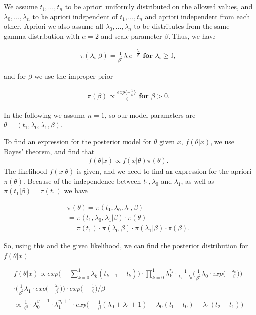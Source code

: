 We assume $t_1,...,t_n$ to be apriori uniformly distributed on the allowed values, and $\lambda_0,...,\lambda_n$ to be apriori independent of $t_1,...,t_n$ and apriori independent from each other. Apriori we also assume all $\lambda_0,...,\lambda_n$ to be distributes from the same gamma distribution with $\alpha = 2$ and scale parameter $\beta$. Thus, we have 

\begin{align}
    \pi(\lambda_i | \beta) = \frac{1}{\beta^2}\lambda_i e^{-\frac{\lambda_i}{\beta}} \textbf{ for } \lambda_i \geq 0,
\end{align}

and for $\beta$ we use the improper prior 

\begin{align}
    \pi (\beta) \propto \frac{exp\{ -\frac{1}{\beta} \} }{\beta} \textbf{ for } \beta > 0.
\end{align}

In the following we assume $n = 1$, so our model parameters are $\theta = (t_1, \lambda_0, \lambda_1, \beta)$. 

To find an expression for the posterior model for $\theta$ given $x$, $f(\theta|x)$, we use Bayes' theorem, and find that 
\begin{align}
    f(\theta|x) \propto f(x|\theta) \pi(\theta).
\end{align}
The likelihood $f(x | \theta)$ is given, and we need to find an expression for the apriori $\pi(\theta)$. Because of the independence between $t_1, \lambda_0$ and $\lambda_1$, as well as $\pi(t_1|\beta) = \pi(t_1)$ we have

\begin{align}
    \pi(\theta) 
    = \pi(t_1, \lambda_0, \lambda_1, \beta) \nonumber \\
    = \pi(t_1, \lambda_0, \lambda_1 | \beta) \cdot \pi(\theta) \nonumber \\
    = \pi(t_1) \cdot \pi(\lambda_0|\beta) \cdot \pi(\lambda_1|\beta) \cdot \pi(\beta).
\end{align}

So, using this and the given likelihood, we can find the posterior distribution for $f(\theta|x)$

\begin{align} \label{eq:post}
    f(\theta|x) \propto exp \Big( - \sum_{k = 0}^1 \lambda_k (t_{k+1} - t_k) \Big)\cdot \prod_{k = 0}^1 \lambda_k^{y_k} \cdot \frac{1}{t_2-t_0} 
    \Big( \frac{1}{\beta^2} \lambda_0 \cdot
    exp \Big({-\frac{\lambda_0}{\beta}} \Big)  \Big) \nonumber \\ 
    \cdot \Big( \frac{1}{\beta^2} \lambda_1 \cdot exp \Big({-\frac{\lambda_1}{\beta}} \Big) \Big) \cdot exp \Big( -\frac{1}{\beta} \Big)/\beta \nonumber \\
    \propto   \frac{1}{\beta^5} \cdot \lambda_0^{y_0 + 1} \cdot \lambda_1^{y_1 + 1} \cdot exp \Big( -\frac{1}{\beta}(\lambda_0 + \lambda_1 + 1) - \lambda_0(t_1-t_0) - \lambda_1(t_2-t_1) \Big)
\end{align}


